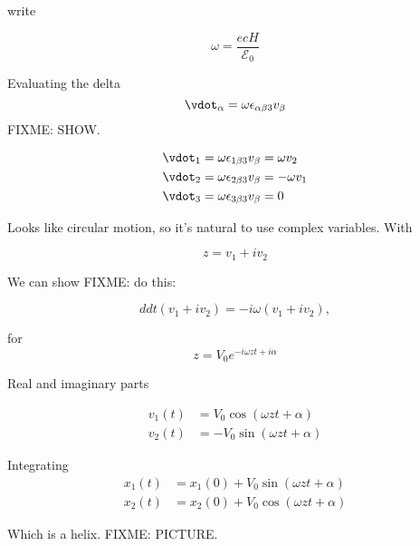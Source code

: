 write

\begin{equation}\label{eqn:relativisticElectrodynamicsT3:n}
\omega = \frac{e c H}{\mathcal{E}_0}
\end{equation}

Evaluating the delta 
\begin{equation}\label{eqn:relativisticElectrodynamicsT3:n}
\vdot_\alpha = \omega \epsilon_{\alpha \beta 3} v_\beta 
\end{equation}
FIXME: SHOW.

\begin{align}\label{eqn:relativisticElectrodynamicsT3:n}
\vdot_1 &= \omega \epsilon_{1 \beta 3} v_\beta = \omega v_2 \\
\vdot_2 &= \omega \epsilon_{2 \beta 3} v_\beta = - \omega v_1 \\
\vdot_3 &= \omega \epsilon_{3 \beta 3} v_\beta = 0
\end{align}

Looks like circular motion, so it's natural to use complex variables.  With

\begin{equation}\label{eqn:relativisticElectrodynamicsT3:n}
z = v_1 + i v_2 
\end{equation}

We can show
FIXME: do this:

\begin{equation}\label{eqn:relativisticElectrodynamicsT3:n}
ddt ( v_1 + i v_2 ) = -i \omega ( v_1 + i v_2 ),
\end{equation}

for
\begin{equation}\label{eqn:relativisticElectrodynamicsT3:n}
z = V_0 e^{-i \omega z t + i \alpha}
\end{equation}

Real and imaginary parts

\begin{align}\label{eqn:relativisticElectrodynamicsT3:n}
v_1(t) &= V_0 \cos( \omega z t + \alpha) \\
v_2(t) &= -V_0 \sin( \omega z t + \alpha)
\end{align}

Integrating
\begin{align}\label{eqn:relativisticElectrodynamicsT3:n}
x_1(t) &= x_1(0) + V_0 \sin( \omega z t + \alpha) \\
x_2(t) &= x_2(0) + V_0 \cos( \omega z t + \alpha)
\end{align}

Which is a helix.
FIXME: PICTURE.

\EndNoBibArticle

